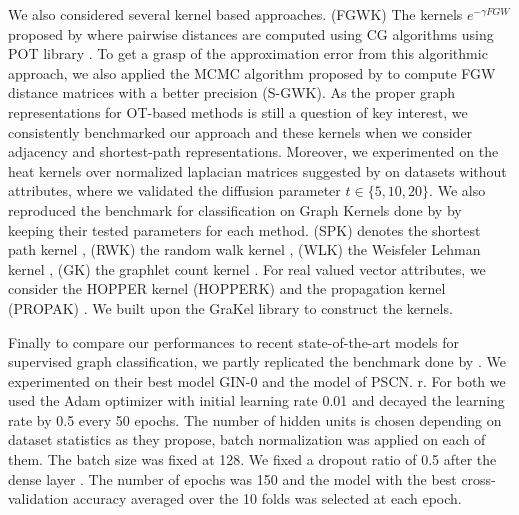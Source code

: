 \documentclass{article}
\begin{document}
	
	We also considered several kernel based approaches. (FGWK) The kernels $e^{-\gamma FGW}$ proposed by \citep{vayer-fused-2018}  where pairwise distances are computed using CG algorithms using POT library \citep{flamary2017pot}. To get a grasp of the approximation error from this algorithmic approach, we also applied the MCMC algorithm proposed by  \citep{chowdhury-generalized-2020} to compute FGW distance matrices with a better precision (S-GWK). As the proper graph representations for OT-based methods is still a question of key interest, we consistently benchmarked our approach and these kernels when we consider adjacency and shortest-path representations. Moreover, we experimented on the heat kernels over normalized laplacian matrices suggested by \citep{chowdhury-generalized-2020} on datasets without attributes, where we validated the diffusion parameter $t \in
	\{5,10,20\}$. We also reproduced the benchmark
	for classification on Graph Kernels done by \citep{vayer-fused-2018} by keeping their tested parameters for each method. (SPK)
	denotes the shortest path kernel \citep{borgwardt2005shortest}, (RWK) the
	random walk kernel \citep{gartner2003graph}, (WLK) the Weisfeler Lehman kernel
	\citep{vishwanathan2010graph}, (GK) the graphlet count kernel
	\citep{shervashidze09}. For real valued vector attributes, we
	consider the HOPPER kernel (HOPPERK) \citep{feragen2013scalable} and the
	propagation kernel (PROPAK) \citep{neumann2016propagation} . We built upon the
	GraKel library \citep{siglidis2020grakel}  to construct the kernels. 
	
	Finally to compare our performances to recent state-of-the-art models for supervised graph classification, we partly replicated the benchmark done by \citep{xu2018powerful}. We experimented on their best model GIN-0 and the model of \citep{niepert-learning-2016} PSCN. r. For both we used the Adam optimizer \citep{kingma2014adam} with initial learning rate 0.01 and decayed the learning rate by 0.5 every 50 epochs. The number of hidden units is chosen depending on dataset statistics as they propose, batch normalization \citep{ioffe2015batch} was applied on each of them. The batch size was fixed at 128. We fixed a dropout ratio of 0.5 after the dense layer \citep{srivastava2014dropout}. The number of epochs was 150 and the model with the best cross-validation accuracy averaged over the 10 folds was selected at each epoch.
	
\end{document}
